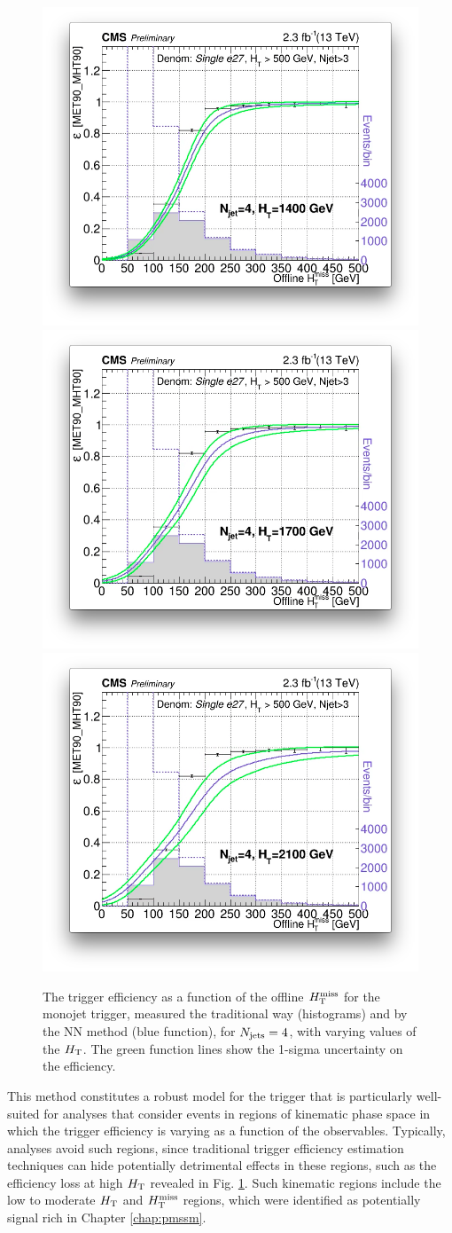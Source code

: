 \begin{figure}[tb!]
\begin{center}
    \includegraphics[width=0.49\linewidth]{figures/trigger/MonoTrigEff_Ht1400.png}\\
        \includegraphics[width=0.49\linewidth]{figures/trigger/MonoTrigEff_Ht1700.png}
    \includegraphics[width=0.49\linewidth]{figures/trigger/MonoTrigEff_Ht2100.png}
    \caption{The trigger efficiency as a function of the offline $H_{\text{T}}^{\rm miss}$ for the monojet trigger, measured the traditional way (histograms) and by the NN method (blue function), for $N_{\rm jets}=4$, with varying values of the $H_{\rm T}$. The green function lines show the 1-sigma uncertainty on the efficiency. }
    \label{fig:mvatrigger}
  \end{center}
\end{figure}
\noindent

This method constitutes a robust model for the trigger that is particularly well-suited for analyses that consider events in regions of kinematic phase space in which the trigger efficiency is varying as a function of the observables.  Typically, analyses avoid such regions, since traditional trigger efficiency estimation techniques can hide potentially detrimental effects in these regions, such as the efficiency loss at high $H_{\rm T}$ revealed in Fig. \ref{fig:mvatrigger}. Such kinematic regions include the low to moderate $H_{\rm T}$ and $H_{\text{T}}^{\rm miss}$ regions, which were identified as potentially signal rich in Chapter \ref{chap:pmssm}.
\FloatBarrier

